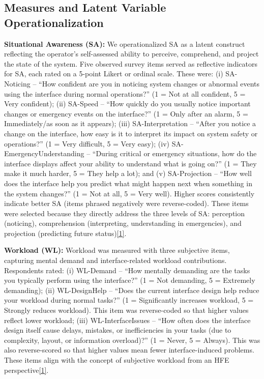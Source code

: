 \documentclass[conference]{IEEEtran}
\begin{document}
\subsection{Measures and Latent Variable Operationalization}
\textbf{Situational Awareness (SA):} We operationalized SA as a latent construct reflecting the operator’s self-assessed ability to perceive, comprehend, and project the state of the system. Five observed survey items served as reflective indicators for SA, each rated on a 5-point Likert or ordinal scale. These were: (i) SA-Noticing – “How confident are you in noticing system changes or abnormal events using the interface during normal operations?” (1 = Not at all confident, 5 = Very confident); (ii) SA-Speed – “How quickly do you usually notice important changes or emergency events on the interface?” (1 = Only after an alarm, 5 = Immediately/as soon as it appears); (iii) SA-Interpretation – “After you notice a change on the interface, how easy is it to interpret its impact on system safety or operations?” (1 = Very difficult, 5 = Very easy); (iv) SA-EmergencyUnderstanding – “During critical or emergency situations, how do the interface displays affect your ability to understand what is going on?” (1 = They make it much harder, 5 = They help a lot); and (v) SA-Projection – “How well does the interface help you predict what might happen next when something in the system changes?” (1 = Not at all, 5 = Very well). Higher scores consistently indicate better SA (items phrased negatively were reverse-coded). These items were selected because they directly address the three levels of SA: perception (noticing), comprehension (interpreting, understanding in emergencies), and projection (predicting future status)\href{https://www.researchgate.net/publication/337420277_Designing_for_Situation_Awareness_in_the_Main_Control_Room_of_a_Small_Modular_Reactor}{[1]}.

\textbf{Workload (WL):} Workload was measured with three subjective items, capturing mental demand and interface-related workload contributions. Respondents rated: (i) WL-Demand – “How mentally demanding are the tasks you typically perform using the interface?” (1 = Not demanding, 5 = Extremely demanding); (ii) WL-DesignHelp – “Does the current interface design help reduce your workload during normal tasks?” (1 = Significantly increases workload, 5 = Strongly reduces workload). This item was reverse-coded so that higher values reflect lower workload; (iii) WL-InterfaceIssues – “How often does the interface design itself cause delays, mistakes, or inefficiencies in your tasks (due to complexity, layout, or information overload)?” (1 = Never, 5 = Always). This was also reverse-scored so that higher values mean fewer interface-induced problems. These items align with the concept of subjective workload from an HFE perspective\href{https://www.researchgate.net/publication/337420277_Designing_for_Situation_Awareness_in_the_Main_Control_Room_of_a_Small_Modular_Reactor}{[1]}.
\end{document}

